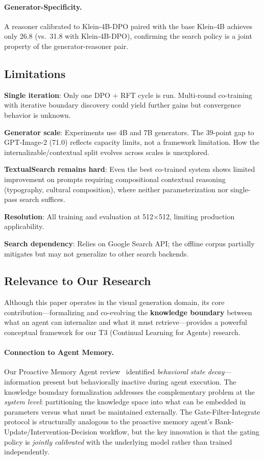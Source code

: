 \documentclass[11pt,a4paper]{article}
\begin{document}
\paragraph{Generator-Specificity.} A reasoner calibrated to Klein-4B-DPO paired with the base Klein-4B achieves only 26.8 (vs.\ 31.8 with Klein-4B-DPO), confirming the search policy is a joint property of the generator-reasoner pair.

\subsection{Limitations}

\textbf{Single iteration}: Only one DPO + RFT cycle is run. Multi-round co-training with iterative boundary discovery could yield further gains but convergence behavior is unknown.

\textbf{Generator scale}: Experiments use 4B and 7B generators. The 39-point gap to GPT-Image-2 (71.0) reflects capacity limits, not a framework limitation. How the internalizable/contextual split evolves across scales is unexplored.

\textbf{TextualSearch remains hard}: Even the best co-trained system shows limited improvement on prompts requiring compositional contextual reasoning (typography, cultural composition), where neither parameterization nor single-pass search suffices.

\textbf{Resolution}: All training and evaluation at 512$\times$512, limiting production applicability.

\textbf{Search dependency}: Relies on Google Search API; the offline corpus partially mitigates but may not generalize to other search backends.

\subsection{Relevance to Our Research}

Although this paper operates in the visual generation domain, its core contribution---formalizing and co-evolving the \textbf{knowledge boundary} between what an agent can internalize and what it must retrieve---provides a powerful conceptual framework for our T3 (Continual Learning for Agents) research.

\paragraph{Connection to Agent Memory.} Our Proactive Memory Agent review~\cite{proactivemem2026} identified \emph{behavioral state decay}---information present but behaviorally inactive during agent execution. The knowledge boundary formalization addresses the complementary problem at the \emph{system level}: partitioning the knowledge space into what can be embedded in parameters versus what must be maintained externally. The Gate-Filter-Integrate protocol is structurally analogous to the proactive memory agent's Bank-Update/Intervention-Decision workflow, but the key innovation is that the gating policy is \emph{jointly calibrated} with the underlying model rather than trained independently.
\end{document}
